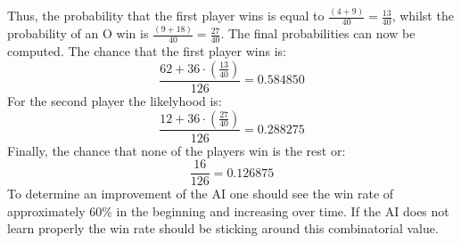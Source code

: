 \documentclass[12pt]{article}
\begin{document}
Thus, the probability that the first player wins is equal to $\frac{(4+9)}{40} = \frac{13}{40}$, whilst the probability of an O win is $\frac{(9+18)}{40} = \frac{27}{40}$.
The final probabilities can now be computed. The chance that the first player wins is:
\begin{equation}\nonumber
 \frac{62 + 36 \cdot \left ( \frac{13}{40} \right ) }{126} =  0.584850 
\end{equation}
For the second player the likelyhood is:
\begin{equation}\nonumber
 \frac{12 + 36 \cdot \left ( \frac{27}{40} \right ) }{126} =  0.288275 
\end{equation}
Finally, the chance that none of the players win is the rest or:
\begin{equation}\nonumber
\frac{16}{126} = 0.126875
\end{equation}
To determine an improvement of the \gls{AI} one should see the win rate of approximately $ 60\% $ in the beginning and increasing over time. If the \gls{AI} does not learn properly the win rate should be sticking around this combinatorial value.
\end{document}
